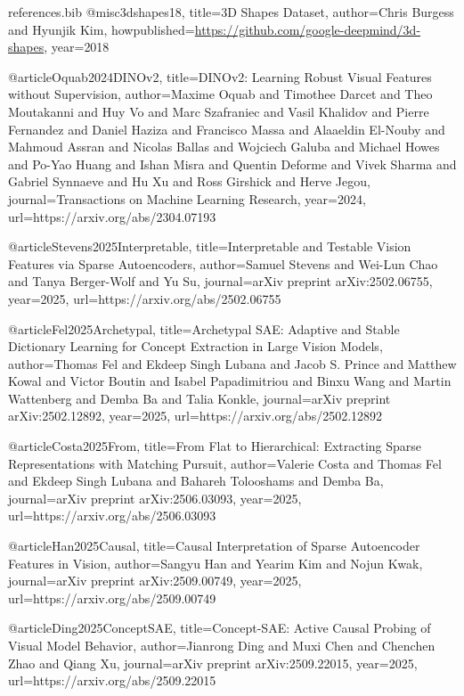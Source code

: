 \begin{filecontents*}{references.bib}
@misc{3dshapes18,
  title={3D Shapes Dataset},
  author={Chris Burgess and Hyunjik Kim},
  howpublished={\url{https://github.com/google-deepmind/3d-shapes}},
  year={2018}
}

@article{Oquab2024DINOv2,
  title={DINOv2: Learning Robust Visual Features without Supervision},
  author={Maxime Oquab and Timothee Darcet and Theo Moutakanni and Huy Vo and Marc Szafraniec and Vasil Khalidov and Pierre Fernandez and Daniel Haziza and Francisco Massa and Alaaeldin El-Nouby and Mahmoud Assran and Nicolas Ballas and Wojciech Galuba and Michael Howes and Po-Yao Huang and Ishan Misra and Quentin Deforme and Vivek Sharma and Gabriel Synnaeve and Hu Xu and Ross Girshick and Herve Jegou},
  journal={Transactions on Machine Learning Research},
  year={2024},
  url={https://arxiv.org/abs/2304.07193}
}

@article{Stevens2025Interpretable,
  title={Interpretable and Testable Vision Features via Sparse Autoencoders},
  author={Samuel Stevens and Wei-Lun Chao and Tanya Berger-Wolf and Yu Su},
  journal={arXiv preprint arXiv:2502.06755},
  year={2025},
  url={https://arxiv.org/abs/2502.06755}
}

@article{Fel2025Archetypal,
  title={Archetypal SAE: Adaptive and Stable Dictionary Learning for Concept Extraction in Large Vision Models},
  author={Thomas Fel and Ekdeep Singh Lubana and Jacob S. Prince and Matthew Kowal and Victor Boutin and Isabel Papadimitriou and Binxu Wang and Martin Wattenberg and Demba Ba and Talia Konkle},
  journal={arXiv preprint arXiv:2502.12892},
  year={2025},
  url={https://arxiv.org/abs/2502.12892}
}

@article{Costa2025From,
  title={From Flat to Hierarchical: Extracting Sparse Representations with Matching Pursuit},
  author={Valerie Costa and Thomas Fel and Ekdeep Singh Lubana and Bahareh Tolooshams and Demba Ba},
  journal={arXiv preprint arXiv:2506.03093},
  year={2025},
  url={https://arxiv.org/abs/2506.03093}
}

@article{Han2025Causal,
  title={Causal Interpretation of Sparse Autoencoder Features in Vision},
  author={Sangyu Han and Yearim Kim and Nojun Kwak},
  journal={arXiv preprint arXiv:2509.00749},
  year={2025},
  url={https://arxiv.org/abs/2509.00749}
}

@article{Ding2025ConceptSAE,
  title={Concept-SAE: Active Causal Probing of Visual Model Behavior},
  author={Jianrong Ding and Muxi Chen and Chenchen Zhao and Qiang Xu},
  journal={arXiv preprint arXiv:2509.22015},
  year={2025},
  url={https://arxiv.org/abs/2509.22015}
}


\end{filecontents*}
